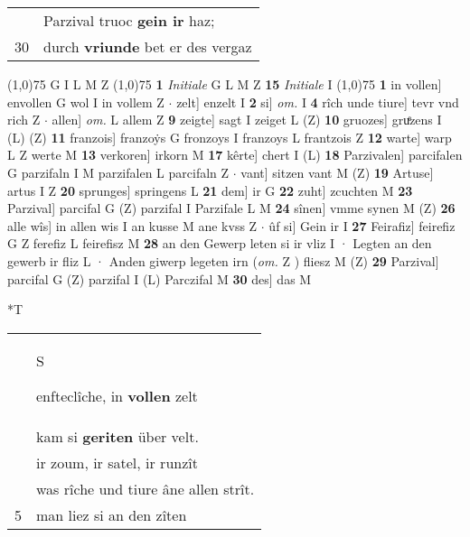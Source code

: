 \documentclass[8pt,a4paper,notitlepage]{article}
\begin{document}
\begin{table}[ht]
\begin{minipage}[t]{0.5\linewidth}
\begin{tabular}{rl}
 & Parzival truoc \textbf{gein ir} haz;\\ 
30 & durch \textbf{vriunde} bet er des vergaz\\ 
\end{tabular}
\scriptsize
\line(1,0){75} \newline
G I L M Z \newline
\line(1,0){75} \newline
\textbf{1} \textit{Initiale} G L M Z  \textbf{15} \textit{Initiale} I  \newline
\line(1,0){75} \newline
\textbf{1} in vollen] envollen G wol I in vollem Z  $\cdot$ zelt] enzelt I \textbf{2} si] \textit{om.} I \textbf{4} rîch unde tiure] tevr vnd rich Z  $\cdot$ allen] \textit{om.} L allem Z \textbf{9} zeigte] sagt I zeiget L (Z) \textbf{10} gruozes] gruͤzens I (L) (Z) \textbf{11} franzois] franzoẏs G fronzoys I franzoys L frantzois Z \textbf{12} warte] warp L Z werte M \textbf{13} verkoren] irkorn M \textbf{17} kêrte] chert I (L) \textbf{18} Parzivalen] parcifalen G parzifaln I M parzifalen L parcifaln Z  $\cdot$ vant] sitzen vant M (Z) \textbf{19} Artuse] artus I Z \textbf{20} sprunges] springens L \textbf{21} dem] ir G \textbf{22} zuht] zcuchten M \textbf{23} Parzival] parcifal G (Z) parzifal I Parzifale L M \textbf{24} sînen] vmme synen M (Z) \textbf{26} alle wîs] in allen wis I an kusse M ane kvss Z  $\cdot$ ûf si] Gein ir I \textbf{27} Feirafiz] feirefiz G Z ferefiz L feirefisz M \textbf{28} an den Gewerp leten si ir vliz I · Legten an den gewerb ir fliz L · Anden giwerp legeten irn (\textit{om.} Z ) fliesz M (Z) \textbf{29} Parzival] parcifal G (Z) parzifal I (L) Parczifal M \textbf{30} des] das M \newline
\end{minipage}
\hspace{0.5cm}
\begin{minipage}[t]{0.5\linewidth}
\small
\begin{center}*T
\end{center}
\begin{tabular}{rl}
 & \begin{large}S\end{large}enfteclîche, in \textbf{vollen} zelt\\ 
 & kam si \textbf{geriten} über velt.\\ 
 & ir zoum, ir satel, ir runzît\\ 
 & was rîche und tiure âne allen strît.\\ 
5 & man liez si an den zîten\\ 

\end{tabular}
\end{minipage}
\end{table}
\end{document}
